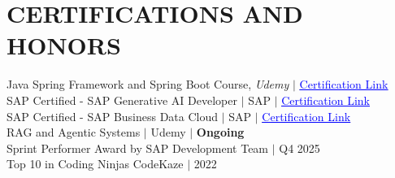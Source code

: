 \documentclass[a4paper,11pt]{article}
\begin{document}
\section{CERTIFICATIONS AND HONORS}
\begin{itemize}[leftmargin=0in, label={}]
  \small{\item{
    Java Spring Framework and Spring Boot Course, \textit{Udemy} $|$
    \href{https://drive.google.com/file/d/15Y_vlXhcvLmf3lc3POhsCfqhXIZ-PFnW/view?usp=drivesdk}{\textcolor{blue}{\underline{Certification Link}}} \vspace{2pt} \\
    SAP Certified - SAP Generative AI Developer $|$ SAP $|$
    \href{https://drive.google.com/file/d/1uqNKE2333en0DDXJJANov45yeBwHCy5_/view} {\textcolor{blue}{\underline{Certification Link}}} \vspace{2pt} \\
    SAP Certified - SAP Business Data Cloud $|$ SAP $|$
    \href{https://drive.google.com/file/d/1n8qdoP86aJObm5_9nm-E8dtE3wyYF31d/view} {\textcolor{blue}{\underline{Certification Link}}} \vspace{2pt} \\
    RAG and Agentic Systems $|$ Udemy $|$ \textbf{Ongoing}\vspace{2pt} \\
    Sprint Performer Award by SAP Development Team $|$ Q4 2025\vspace{2pt}\\
    Top 10 in Coding Ninjas CodeKaze $|$ 2022\\
  }}
\end{itemize}
\end{document}
